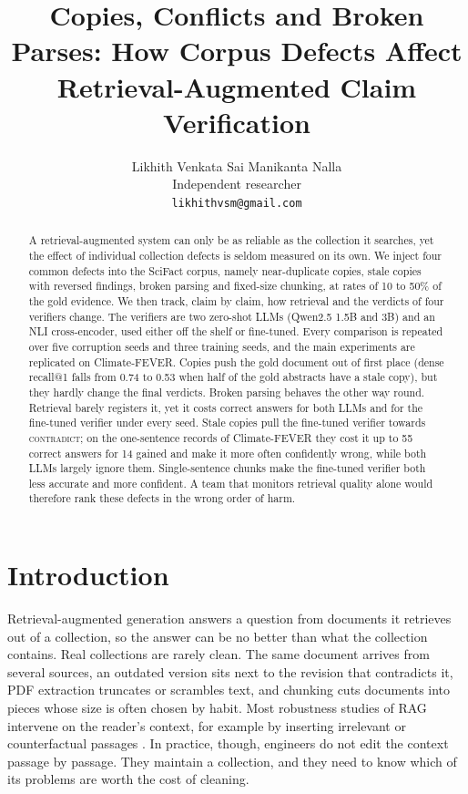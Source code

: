 \documentclass[11pt]{article}
\title{Copies, Conflicts and Broken Parses: How Corpus Defects Affect\\Retrieval-Augmented Claim Verification}
\author{Likhith Venkata Sai Manikanta Nalla \\
  Independent researcher \\
  \texttt{likhithvsm@gmail.com}}
\begin{document}
\maketitle

\begin{abstract}
A retrieval-augmented system can only be as reliable as the collection it searches, yet the effect of
individual collection defects is seldom measured on its own. We inject four common defects into the
SciFact corpus, namely near-duplicate copies, stale copies with reversed findings, broken parsing and
fixed-size chunking, at rates of 10 to 50\% of the gold evidence. We then track, claim by claim, how
retrieval and the verdicts of four verifiers change. The verifiers are two zero-shot LLMs (Qwen2.5 1.5B
and 3B) and an NLI cross-encoder, used either off the shelf or fine-tuned. Every comparison is repeated
over five corruption seeds and three training seeds, and the main experiments are replicated on
Climate-FEVER. Copies push the gold document out of first place (dense recall@1 falls from 0.74 to 0.53
when half of the gold abstracts have a stale copy), but they hardly change the final verdicts. Broken
parsing behaves the other way round. Retrieval barely registers it, yet it costs correct answers for both
LLMs and for the fine-tuned verifier under every seed. Stale copies pull the fine-tuned verifier towards
\textsc{contradict}; on the one-sentence records of Climate-FEVER they cost it up to 55 correct answers
for 14 gained and make it more often confidently wrong, while both LLMs largely ignore them.
Single-sentence chunks make the fine-tuned verifier both less accurate and more confident. A team that
monitors retrieval quality alone would therefore rank these defects in the wrong order of harm.
\end{abstract}

\section{Introduction}

Retrieval-augmented generation \citep[RAG;][]{lewis2020rag} answers a question from documents it
retrieves out of a collection, so the answer can be no better than what the collection contains. Real
collections are rarely clean. The same document arrives from several sources, an outdated version sits
next to the revision that contradicts it, PDF extraction truncates or scrambles text, and chunking cuts
documents into pieces whose size is often chosen by habit. Most robustness studies of RAG intervene on
the reader's context, for example by inserting irrelevant or counterfactual passages
\citep{cuconasu2024noise,chen2024rgb,xie2024chameleon}. In practice, though, engineers do not edit the
context passage by passage. They maintain a collection, and they need to know which of its problems are
worth the cost of cleaning.
\end{document}
